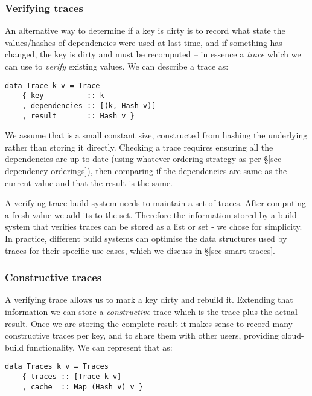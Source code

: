 \subsubsection{Verifying traces}\label{sec-verifying-traces}

An alternative way to determine if a key is dirty is to record what state the
values/hashes of dependencies were used at last time, and if something has
changed, the key is dirty and must be recomputed -- in essence a \emph{trace}
which we can use to \emph{verify} existing values. We can describe a trace as:

\begin{verbatim}
data Trace k v = Trace
    { key          :: k
    , dependencies :: [(k, Hash v)]
    , result       :: Hash v }
\end{verbatim}

We assume that  is a small constant size, constructed from hashing the
underlying  rather than storing it directly. Checking a trace requires
ensuring all the dependencies are up to date (using whatever ordering strategy
as per \S\ref{sec-dependency-orderings}), then comparing if the dependencies are
same as the current value and that the result is the same.

A verifying trace build system needs to maintain a set of traces. After computing a
fresh value we add its  to the set. Therefore the information stored
by a build system that verifies traces can be stored as a list or set - we chose \hs{[Trace k v]} for simplicity. In practice, different build systems can optimise the data structures used by traces for their specific use cases, which we discuss in \S\ref{sec-smart-traces}.

\subsubsection{Constructive traces}\label{sec-constructive-traces}

A verifying trace allows us to mark a key dirty and rebuild it. Extending that information we can store a \emph{constructive} trace which is the trace plus the actual result. Once we are storing the complete result it makes sense to record many constructive traces per key, and to share them with other users, providing cloud-build functionality. We can represent that as:

\begin{verbatim}
data Traces k v = Traces
    { traces :: [Trace k v]
    , cache  :: Map (Hash v) v }
\end{verbatim}

